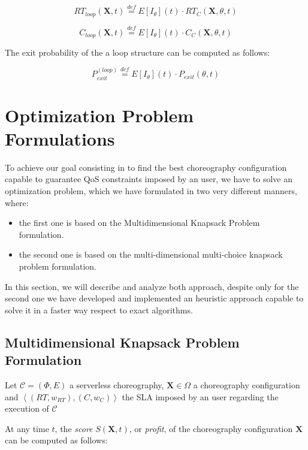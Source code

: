 \documentclass[12pt,a4paper]{report}
\newcommand{\mathDef}{\overset{\textit{def}}{=}}
\theoremstyle{definition}
\begin{document}
\begin{equation}
	RT_{loop}(\textbf{X}, t) \mathDef E[I_{\theta}](t) \cdot  RT_C(\textbf{X}, \theta, t)
\end{equation}

\begin{equation}
	C_{loop}(\textbf{X}, t) \mathDef E[I_{\theta}](t) \cdot C_C(\textbf{X}, \theta, t)
\end{equation}

The exit probability of the a loop structure can be computed as follows:

\begin{equation}
	P_{exit}^{(loop)} \mathDef E[I_{\theta}](t) \cdot P_{exit}(\theta, t)
\end{equation}

\section{Optimization Problem Formulations}

To achieve our goal consisting in to find the best choreography configuration capable to guarantee QoS constraints imposed by an user, we have to solve an optimization problem, which we have formulated in two very different manners, where:

\begin{itemize}
	\item the first one is based on the Multidimensional Knapsack Problem formulation.
	\item the second one is based on the multi-dimensional multi-choice knapsack problem formulation. 
\end{itemize}

In this section, we will describe and analyze both approach, despite only for the second one we have developed and implemented an heuristic approach capable to solve it in a faster way respect to exact algorithms. 

\subsection{Multidimensional Knapsack Problem Formulation}

Let $\mathcal{C} = (\Phi,E)$ a serverless choreography, $\textbf{X} \in \Omega$ a choreography configuration and $\left\langle (RT,w_{RT}),(C,w_{C}) \right\rangle$ the SLA imposed by an user regarding the execution of $\mathcal{C}$

At any time $t$, the \textit{score} $S(\textbf{X},t)$, or \textit{profit}, of the choreography configuration $\textbf{X}$ can be computed as follows:
\end{document}
